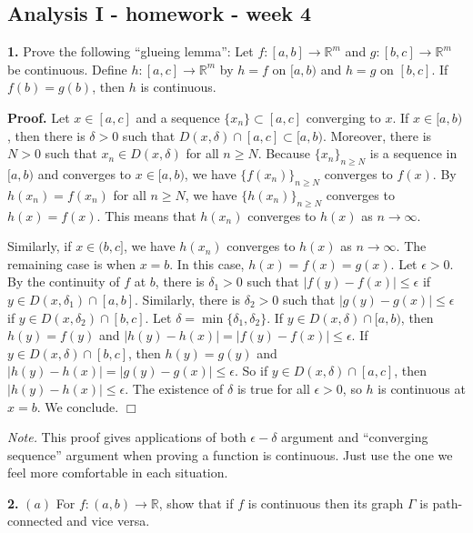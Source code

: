 \documentclass{article}
\begin{document}
    
    
    
    
    

    
    \subsection*{Analysis I - homework - week
4}\label{analysis-i---homework---week-4}

    \textbf{1.} Prove the following ``glueing lemma'': Let
$f:[a,b]\to \mathbb{R}^m$ and $g:[b,c]\to \mathbb{R}^m$ be continuous.
Define $h:[a,c]\to\mathbb{R}^m$ by $h=f$ on $[a,b)$ and $h=g$ on
$[b,c]$. If $f(b) = g(b)$, then $h$ is continuous.

\textbf{Proof.} Let $x \in [a,c]$ and a sequence $\{x_n\}\subset [a,c]$
converging to $x$. If $x\in [a,b)$, then there is $\delta >0$ such that
$D(x,\delta)\cap [a,c] \subset [a,b)$. Moreover, there is $N > 0$ such
that $x_n \in D(x,\delta)$ for all $n\ge N$. Because $\{x_n\}_{n\ge N}$
is a sequence in $[a,b)$ and converges to $x\in [a,b)$, we have
$\{f(x_n)\}_{n\ge N}$ converges to $f(x)$. By $h(x_n) = f(x_n)$ for all
$n\ge N$, we have $\{h(x_n)\}_{n\ge N}$ converges to $h(x)=f(x)$. This
means that $h(x_n)$ converges to $h(x)$ as $n \to \infty$.

Similarly, if $x\in (b,c]$, we have $h(x_n)$ converges to $h(x)$ as
$n\to \infty$. The remaining case is when $x = b$. In this case,
$h(x) = f(x) = g(x)$. Let $\epsilon >0$. By the continuity of $f$ at
$b$, there is $\delta_1 > 0$ such that $|f(y)-f(x)|\le \epsilon$ if
$y\in D(x,\delta_1)\cap [a,b]$. Similarly, there is $\delta_2 > 0$ such
that $|g(y)-g(x)|\le \epsilon$ if $y\in D(x,\delta_2)\cap [b,c]$. Let
$\delta = \min\{\delta_1,\delta_2\}$. If $y\in D(x,\delta)\cap [a,b)$,
then $h(y) = f(y)$ and $|h(y)-h(x)| = |f(y)-f(x)| \le \epsilon$. If
$y\in D(x,\delta)\cap [b,c]$, then $h(y) = g(y)$ and
$|h(y)-h(x)| = |g(y)-g(x)| \le \epsilon$. So if
$y\in D(x,\delta)\cap [a,c]$, then $|h(y)-h(x)| \le \epsilon$. The
existence of $\delta$ is true for all $\epsilon > 0$, so $h$ is
continuous at $x=b$. We conclude. $\Box$

\emph{Note.} This proof gives applications of both $\epsilon-\delta$
argument and ``converging sequence'' argument when proving a function is
continuous. Just use the one we feel more comfortable in each situation.

    \textbf{2.} $(a)$ For $f:(a,b)\to \mathbb{R}$, show that if $f$ is
continuous then its graph $\Gamma$ is path-connected and vice versa.
\end{document}
